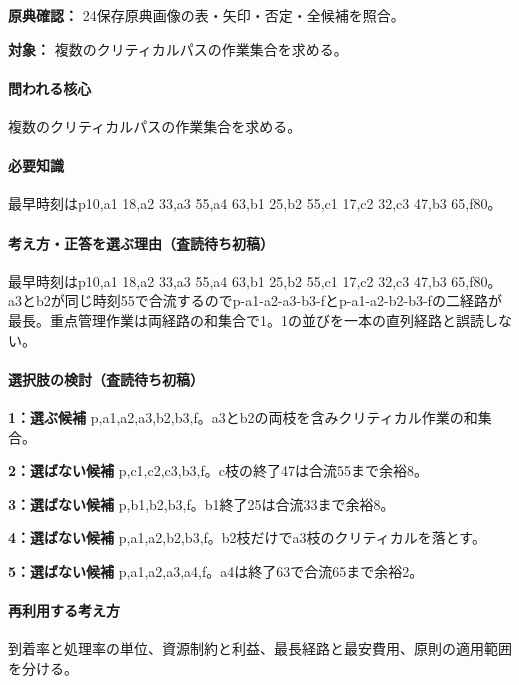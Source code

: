 \noindent\textbf{原典確認：} 24保存原典画像の表・矢印・否定・全候補を照合。\par

\noindent\textbf{対象：} 複数のクリティカルパスの作業集合を求める。\par

\paragraph{問われる核心} 複数のクリティカルパスの作業集合を求める。

\paragraph{必要知識} 最早時刻はp10,a1 18,a2 33,a3 55,a4 63,b1 25,b2 55,c1 17,c2 32,c3 47,b3 65,f80。

\paragraph{考え方・正答を選ぶ理由（査読待ち初稿）} 最早時刻はp10,a1 18,a2 33,a3 55,a4 63,b1 25,b2 55,c1 17,c2 32,c3 47,b3 65,f80。a3とb2が同じ時刻55で合流するのでp-a1-a2-a3-b3-fとp-a1-a2-b2-b3-fの二経路が最長。重点管理作業は両経路の和集合で1。1の並びを一本の直列経路と誤読しない。

\paragraph{選択肢の検討（査読待ち初稿）}\mbox{}\par

\noindent\textbf{1：選ぶ候補} p,a1,a2,a3,b2,b3,f。a3とb2の両枝を含みクリティカル作業の和集合。\par

\noindent\textbf{2：選ばない候補} p,c1,c2,c3,b3,f。c枝の終了47は合流55まで余裕8。\par

\noindent\textbf{3：選ばない候補} p,b1,b2,b3,f。b1終了25は合流33まで余裕8。\par

\noindent\textbf{4：選ばない候補} p,a1,a2,b2,b3,f。b2枝だけでa3枝のクリティカルを落とす。\par

\noindent\textbf{5：選ばない候補} p,a1,a2,a3,a4,f。a4は終了63で合流65まで余裕2。\par

\paragraph{再利用する考え方} 到着率と処理率の単位、資源制約と利益、最長経路と最安費用、原則の適用範囲を分ける。

